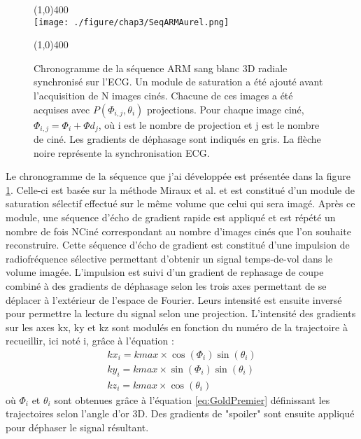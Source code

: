 \begin{figure}[H]
\centering \line(1,0){400} \\
\texttt{[image: ./figure/chap3/SeqARMAurel.png]}
\caption[Chronogramme ARM dynamique]{\label{fig:SeqARMAurel} Chronogramme de la séquence ARM sang blanc 3D radiale synchronisé sur l'ECG. Un module de saturation a été ajouté avant l'acquisition de N images cinés. Chacune de ces images a été acquises avec $P(\Phi_{i,j},\theta_i)$ projections. Pour chaque image ciné, $\Phi_{i,j} = \Phi_i+\Phi d_j$, où i est le nombre de projection et j est le nombre de ciné. Les gradients de déphasage sont indiqués en gris. La flèche noire représente la synchronisation ECG.}
\line(1,0){400} \\ \end{figure}

Le chronogramme de la séquence que j'ai développée est présentée dans la figure \ref{fig:SeqARMAurel}. Celle-ci est basée sur la méthode Miraux et al. \cite{Miraux:2006fu} et est constitué d'un module de saturation sélectif effectué sur le même volume que celui qui sera imagé. Après ce module, une séquence d'écho de gradient rapide est appliqué et est répété un nombre de fois NCiné correspondant au nombre d'images cinés que l'on souhaite reconstruire. Cette séquence d'écho de gradient est constitué d'une impulsion de radiofréquence sélective permettant d'obtenir un signal temps-de-vol dans le volume imagée. L'impulsion est suivi d'un gradient de rephasage de coupe combiné à des gradients de déphasage selon les trois axes permettant de se déplacer à l'extérieur de l'espace de Fourier. Leurs intensité est ensuite inversé pour permettre la lecture du signal selon une projection. 
L'intensité des gradients sur les axes kx, ky et kz sont modulés en fonction du numéro de la trajectoire à recueillir, ici noté i, grâce à l'équation :
\begin{equation}
\label{eq:GoldPremier}
\begin{array}{c}
kx_i = kmax \times \cos(\Phi_i) \sin(\theta_i) \\
ky_i = kmax \times \sin(\Phi_i) \sin(\theta_i) \\
kz_i = kmax \times \cos(\theta_i)
\end{array}
\end{equation}
où $\Phi_i$ et $\theta_i$ sont obtenues grâce à l'équation \ref{eq:GoldPremier} définissant les trajectoires selon l'angle d'or 3D. Des gradients de "spoiler" sont ensuite appliqué pour déphaser le signal résultant.

